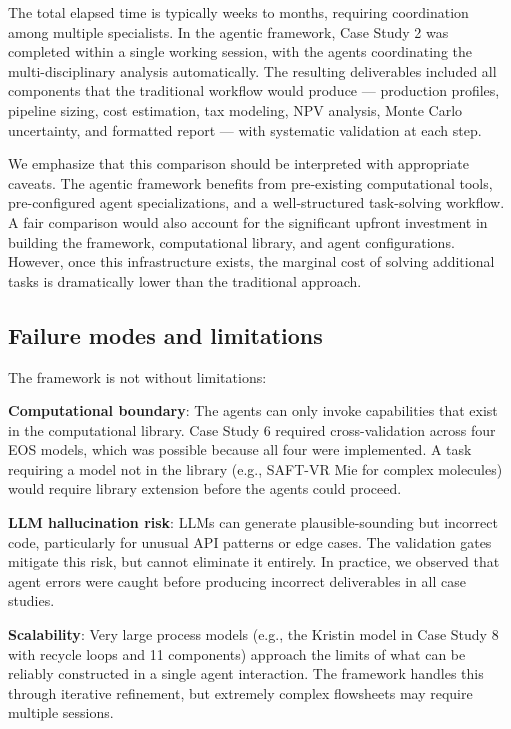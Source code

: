 \documentclass[review,3p]{elsarticle}
\begin{document}
The total elapsed time is typically weeks to months, requiring coordination among multiple specialists. In the agentic framework, Case Study 2 was completed within a single working session, with the agents coordinating the multi-disciplinary analysis automatically. The resulting deliverables included all components that the traditional workflow would produce --- production profiles, pipeline sizing, cost estimation, tax modeling, NPV analysis, Monte Carlo uncertainty, and formatted report --- with systematic validation at each step.

We emphasize that this comparison should be interpreted with appropriate caveats. The agentic framework benefits from pre-existing computational tools, pre-configured agent specializations, and a well-structured task-solving workflow. A fair comparison would also account for the significant upfront investment in building the framework, computational library, and agent configurations. However, once this infrastructure exists, the marginal cost of solving additional tasks is dramatically lower than the traditional approach.

\subsection{Failure modes and limitations}

The framework is not without limitations:

\textbf{Computational boundary}: The agents can only invoke capabilities that exist in the computational library. Case Study 6 required cross-validation across four EOS models, which was possible because all four were implemented. A task requiring a model not in the library (e.g., SAFT-VR Mie for complex molecules) would require library extension before the agents could proceed.

\textbf{LLM hallucination risk}: LLMs can generate plausible-sounding but incorrect code, particularly for unusual API patterns or edge cases. The validation gates mitigate this risk, but cannot eliminate it entirely. In practice, we observed that agent errors were caught before producing incorrect deliverables in all case studies.

\textbf{Scalability}: Very large process models (e.g., the Kristin model in Case Study 8 with recycle loops and 11 components) approach the limits of what can be reliably constructed in a single agent interaction. The framework handles this through iterative refinement, but extremely complex flowsheets may require multiple sessions.
\end{document}
